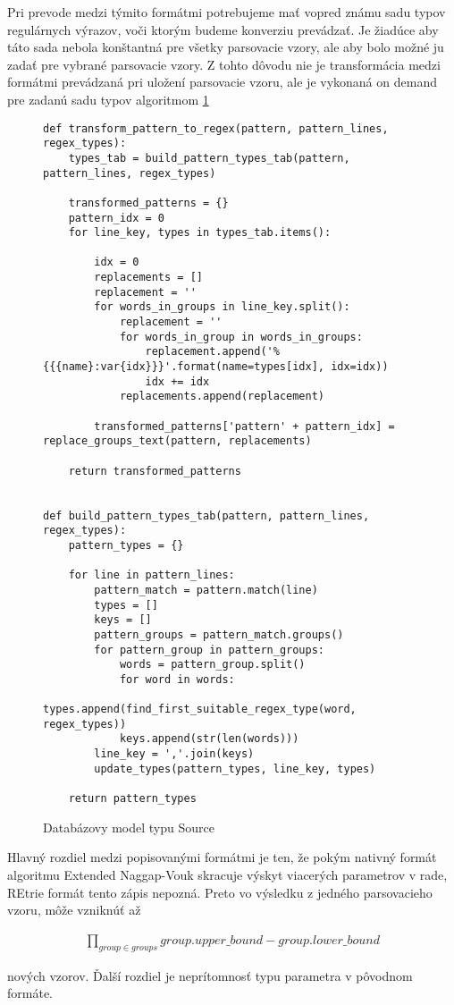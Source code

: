 Pri prevode medzi týmito formátmi potrebujeme mať vopred známu sadu typov regulárnych výrazov, voči ktorým budeme konverziu prevádzať. Je žiadúce aby táto sada nebola konštantná pre všetky parsovacie vzory, ale aby bolo možné ju zadať pre vybrané parsovacie vzory. Z tohto dôvodu nie je transformácia medzi formátmi prevádzaná pri uložení parsovacie vzoru, ale je vykonaná on demand pre zadanú sadu typov algoritmom \ref{fig:pattern-transformation}

\begin{figure}[htbp]
\centering
\begin{minipage}{0.9\textwidth}
\lstset{tabsize=4,columns=flexible,breaklines=true,breakatwhitespace=true, showstringspaces=false}
\begin{lstlisting}
def transform_pattern_to_regex(pattern, pattern_lines, regex_types):
    types_tab = build_pattern_types_tab(pattern, pattern_lines, regex_types)

    transformed_patterns = {}
    pattern_idx = 0
    for line_key, types in types_tab.items():

        idx = 0
        replacements = []
        replacement = ''
        for words_in_groups in line_key.split():
            replacement = ''
            for words_in_group in words_in_groups:
                replacement.append('%{{{name}:var{idx}}}'.format(name=types[idx], idx=idx))
                idx += idx
            replacements.append(replacement)
            
        transformed_patterns['pattern' + pattern_idx] = replace_groups_text(pattern, replacements)

    return transformed_patterns


def build_pattern_types_tab(pattern, pattern_lines, regex_types):
    pattern_types = {}

    for line in pattern_lines:
        pattern_match = pattern.match(line)
        types = []
        keys = []
        pattern_groups = pattern_match.groups()
        for pattern_group in pattern_groups:
            words = pattern_group.split()
            for word in words:
                types.append(find_first_suitable_regex_type(word, regex_types))
            keys.append(str(len(words)))
        line_key = ','.join(keys)
        update_types(pattern_types, line_key, types)

    return pattern_types
\end{lstlisting} 		
\end{minipage} 
\caption{Databázovy model typu Source}
\label{fig:pattern-transformation}
\end{figure}

Hlavný rozdiel medzi popisovanými formátmi je ten, že pokým nativný formát algoritmu Extended Naggap-Vouk skracuje výskyt viacerých parametrov v rade, REtrie formát tento zápis nepozná. Preto vo výsledku z jedného parsovacieho vzoru, môže vzniknúť až 

\begin{align*}
\prod_{group \in groups} group.upper\_bound - group.lower\_bound
\end{align*}

nových vzorov. Ďalší rozdiel je neprítomnosť typu parametra v pôvodnom formáte.
